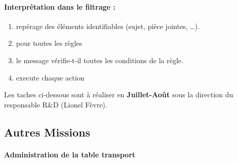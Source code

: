 \paragraph{Interprêtation dans le filtrage :}
\begin{enumerate}
\item repérage des éléments identifiables (sujet, pièce jointes, …).
\item pour toutes les règles 
\item le message vérifie-t-il toutes les conditions de la règle.
\item execute chaque action
\end{enumerate}
Les taches ci-dessous sont à réaliser en \textbf{Juillet-Août} sous la direction du responsable R\&D (Lionel Fèvre).
\subsection{Autres Missions}
\paragraph{Administration de la table transport}




